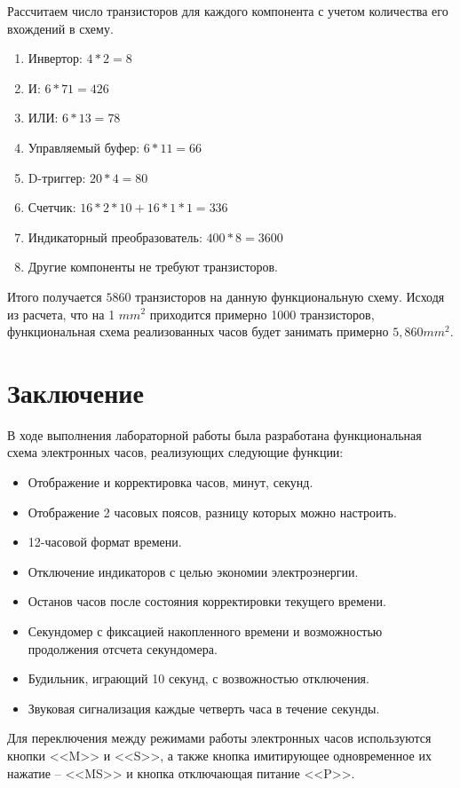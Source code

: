 \documentclass[11pt,a4paper,final]{article}
\begin{document}
	Рассчитаем число транзисторов для каждого компонента с учетом количества его вхождений в схему.
	\begin{enumerate}[label=]
		\item $\text{Инвертор: } 4 * 2 = 8$ 
		\item $\text{И: }  6 * 71 = 426$
		\item $\text{ИЛИ: }  6 * 13 = 78$
		\item $\text{Управляемый буфер: }  6 * 11 = 66$
		\item $\text{D-триггер: }  20 * 4 = 80$
		\item $\text{Счетчик: }  16 * 2 * 10 + 16 * 1 * 1 = 336$
		\item $\text{Индикаторный преобразователь: }  400 * 8 = 3600 $
		\item Другие компоненты не требуют транзисторов.
	\end{enumerate}
	Итого получается  $5860$ транзисторов на данную функциональную схему. Исходя из расчета, что на 1 $mm^2$ приходится примерно 1000 транзисторов, функциональная схема реализованных часов будет занимать примерно $5,860 mm^2$.
	
	
	\newpage
	\section*{Заключение}
	В ходе выполнения лабораторной работы была разработана функциональная схема электронных часов, реализующих следующие функции:
	\begin{itemize}
		\item Отображение и корректировка часов, минут, секунд.
		\item Отображение 2 часовых поясов, разницу которых можно настроить.
		\item 12-часовой формат времени.
		\item Отключение индикаторов с целью экономии электроэнергии.
		\item Останов часов после состояния корректировки текущего времени.
		\item Секундомер с фиксацией накопленного времени и возможностью продолжения отсчета секундомера.
		\item Будильник, играющий 10 секунд, с возвожностью отключения.
		\item Звуковая сигнализация каждые четверть часа в течение секунды.
	\end{itemize}
	
	Для переключения между режимами работы электронных часов используются кнопки <<M>> и <<S>>, а также кнопка имитирующее одновременное  их нажатие -- <<MS>> и кнопка отключающая питание <<P>>.
	
\end{document}
